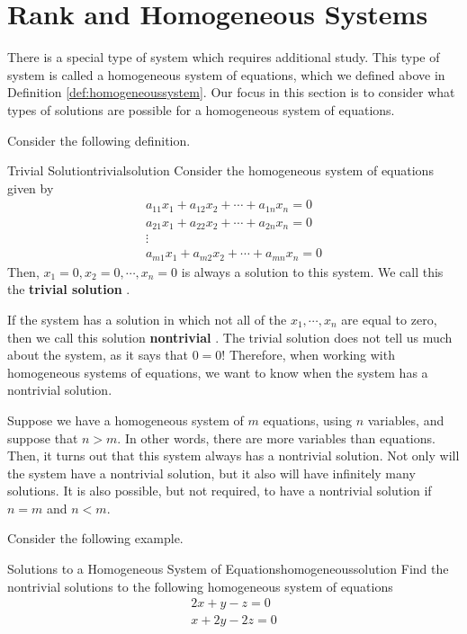 \section{Rank and Homogeneous Systems}

There is a special type of system which requires additional study. This type of system is called a homogeneous system of
equations, which we defined above in Definition \ref{def:homogeneoussystem}. 
Our focus in this section is to consider what types of solutions are possible for a homogeneous system of equations. 

Consider the following definition. 

\begin{definition}{Trivial Solution}{trivialsolution}
Consider the homogeneous system of equations given by
\begin{equation*}
\begin{array}{c}
a_{11}x_{1}+a_{12}x_{2}+\cdots +a_{1n}x_{n}= 0 \\
a_{21}x_{1}+a_{22}x_{2}+\cdots +a_{2n}x_{n}= 0  \\
\vdots \\
a_{m1}x_{1}+a_{m2}x_{2}+\cdots +a_{mn}x_{n}= 0 
\end{array}
\end{equation*}
Then, $x_{1} = 0, x_{2} = 0, \cdots, x_{n} =0$ is always a 
solution to this system. We call this the \textbf{trivial solution} .
\end{definition}

If the system has a solution in which not all of the $x_1, \cdots, x_n$ are equal to zero,
then we call this solution \textbf{nontrivial} . The trivial solution
does not tell us much about the system, as it says that $0=0$! 
Therefore, when working with homogeneous systems of 
equations, we want to know when the system has a nontrivial solution. 

Suppose we have a homogeneous system of $m$ equations, using $n$ variables, and suppose that
$n > m$. In other words, there are more variables than equations. 
Then, it turns out that this system always has a nontrivial solution. Not only will the
system have a nontrivial solution, but it also will have infinitely many solutions.
It is also possible, but not required, to have a nontrivial solution if $n=m$ and $n<m$.

Consider the following example.

\begin{example}{Solutions to a Homogeneous System of Equations}{homogeneoussolution}
Find the nontrivial solutions to the following homogeneous system of equations
\begin{equation*}
\begin{array}{c}
2x + y - z = 0 \\
x + 2y - 2z = 0
\end{array}
\end{equation*}
\end{example}

